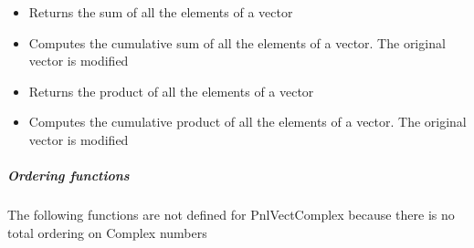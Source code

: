 \begin{itemize}
\item {}
  \sshortdescribe Returns the sum of all the elements of a vector  

\item {}
  \sshortdescribe Computes the cumulative sum of all the elements of a
  vector. The original vector is modified

\item {}
  \sshortdescribe Returns the product of all the elements of a vector  

\item {}
  \sshortdescribe Computes the cumulative product of all the elements of a
  vector. The original vector is modified
\end{itemize}

\subparagraph{Ordering functions}
The following functions are not defined for PnlVectComplex because there is
no total ordering on Complex numbers

